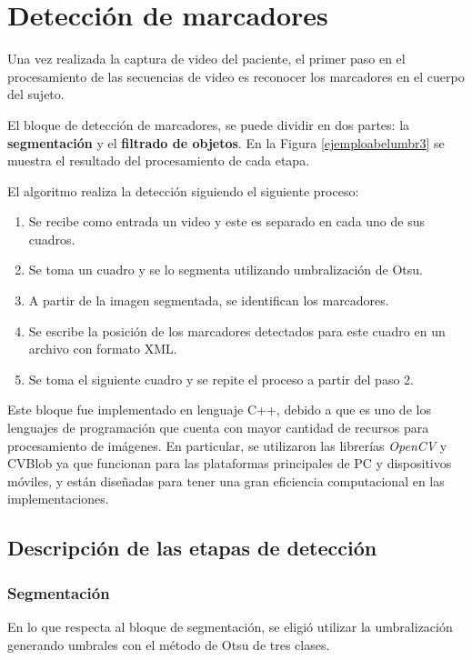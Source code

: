 \section{Detección de marcadores}
Una vez realizada la captura de video del paciente, el primer paso en el procesamiento de las secuencias de video es reconocer los marcadores en el cuerpo del sujeto.

El bloque de detección de marcadores, se puede dividir en dos partes: la \textbf{segmentación} y el \textbf{filtrado de objetos}. En la Figura \ref{ejemploabelumbr3} se muestra el resultado del procesamiento de cada etapa.

El algoritmo realiza la detección siguiendo el siguiente proceso:

\begin{enumerate}
  \item Se recibe como entrada un video y este es separado en cada uno de sus cuadros.
  \item Se toma un cuadro y se lo segmenta utilizando umbralización de Otsu.
  \item A partir de la imagen segmentada, se identifican los marcadores.
  \item Se escribe la posición de los marcadores detectados para este cuadro en un archivo con formato XML.
  \item Se toma el siguiente cuadro y se repite el proceso a partir del paso 2.
\end{enumerate}

Este bloque fue implementado en lenguaje C++, debido a que es uno de los lenguajes de programación que cuenta con mayor cantidad de recursos para procesamiento de imágenes. En particular, se utilizaron las librerías \emph{OpenCV} \cite{opencv} y CVBlob \cite{cvblob} ya que funcionan para las plataformas principales de PC y dispositivos móviles, y están diseñadas para tener una gran eficiencia computacional en las implementaciones.

\subsection{Descripción de las etapas de detección}
\subsubsection{Segmentación}
En lo que respecta al bloque de segmentación, se eligió utilizar la umbralización generando umbrales con el método de Otsu\cite{otsu} de tres clases.

